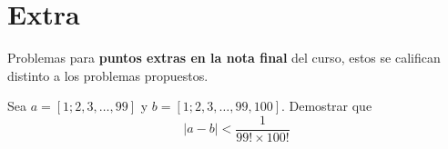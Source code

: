 \section{Extra}

Problemas para \textbf{puntos extras en la nota final} del curso, estos se califican distinto a los problemas propuestos.

\begin{problem}
    Sea $a = [1;2,3, \ldots, 99]$ y $b = [1;2,3, \ldots, 99, 100]$.
    Demostrar que
    \[
        |a - b| < \frac{1}{99! \times 100!}
    \]
\end{problem}